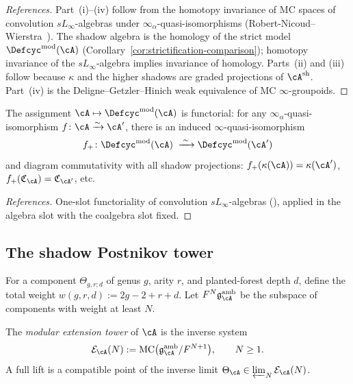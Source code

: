 \begin{proof}[References]
Part~(i)--(iv) follow from the homotopy invariance of MC spaces of
convolution $sL_\infty$-algebras under $\infty_\alpha$-quasi-isomorphisms
(Robert-Nicoud--Wierstra~\cite[Section~8]{RNW19}).  The shadow algebra is
the homology of the strict model $\Defcyc^{\mathrm{mod}}(\cA)$
(Corollary~\ref{cor:strictification-comparison}); homotopy invariance of the
$sL_\infty$-algebra implies invariance of homology.  Parts~(ii) and (iii)
follow because $\kappa$ and the higher shadows are graded projections
of $\cA^{\mathrm{sh}}$.  Part~(iv) is the Deligne--Getzler--Hinich
weak equivalence of MC $\infty$-groupoids.
\end{proof}

\begin{corollary}
\label{cor:deformation-functoriality}
The assignment $\cA \mapsto \Defcyc^{\mathrm{mod}}(\cA)$ is
functorial: for any $\infty_\alpha$-quasi-isomorphism
$f\colon \cA \xrightarrow{\sim} \cA'$, there is an induced
$\infty$-quasi-isomorphism
\[
f_+\colon \Defcyc^{\mathrm{mod}}(\cA)
\;\xrightarrow{\;\sim\;}
\Defcyc^{\mathrm{mod}}(\cA')
\]
and diagram commutativity with all shadow projections:
$f_+(\kappa(\cA)) = \kappa(\cA')$,
$f_+(\mathfrak{C}_\cA) = \mathfrak{C}_{\cA'}$, etc.
\end{corollary}

\begin{proof}[References]
One-slot functoriality of convolution $sL_\infty$-algebras
(\cite[Theorem~5.1]{RNW19}), applied in the algebra slot with the
coalgebra slot fixed.
\end{proof}

\subsection{The shadow Postnikov tower}
\label{subsec:shadow-postnikov-tower}

\begin{definition}
\label{def:weight-filtration-tower}
For a component $\Theta_{g,r;d}$ of genus $g$, arity $r$, and
planted-forest depth $d$, define the total weight
$w(g,r,d) := 2g - 2 + r + d$.
Let $F^N\mathfrak{g}^{\mathrm{amb}}_{\cA}$ be the subspace of
components with weight at least $N$.
\end{definition}

\begin{definition}
\label{def:extension-tower}
The \emph{modular extension tower} of $\cA$ is the inverse system
\begin{equation}
\label{eq:extension-tower}
\mathcal{E}_{\cA}(N)
:=
\operatorname{MC}\bigl(
\mathfrak{g}^{\mathrm{amb}}_{\cA}/F^{N+1}
\bigr),
\qquad N \geq 1.
\end{equation}
A full lift is a compatible point of the inverse limit
$\Theta_{\cA} \in \varprojlim_N \mathcal{E}_{\cA}(N)$.
\end{definition}

